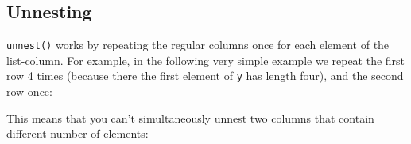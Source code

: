\documentclass[]{book}
\newenvironment{Shaded}{\begin{snugshade}}{\end{snugshade}}
\newcommand{\KeywordTok}[1]{\textcolor[rgb]{0.13,0.29,0.53}{\textbf{{#1}}}}
\newcommand{\DataTypeTok}[1]{\textcolor[rgb]{0.13,0.29,0.53}{{#1}}}
\newcommand{\DecValTok}[1]{\textcolor[rgb]{0.00,0.00,0.81}{{#1}}}
\newcommand{\StringTok}[1]{\textcolor[rgb]{0.31,0.60,0.02}{{#1}}}
\newcommand{\CommentTok}[1]{\textcolor[rgb]{0.56,0.35,0.01}{\textit{{#1}}}}
\newcommand{\OtherTok}[1]{\textcolor[rgb]{0.56,0.35,0.01}{{#1}}}
\newcommand{\NormalTok}[1]{{#1}}
\begin{document}
\begin{Shaded}
\end{Shaded}

\subsection{Unnesting}\label{unnesting-1}

\texttt{unnest()} works by repeating the regular columns once for each
element of the list-column. For example, in the following very simple
example we repeat the first row 4 times (because there the first element
of \texttt{y} has length four), and the second row once:

\begin{Shaded}
\end{Shaded}

This means that you can't simultaneously unnest two columns that contain
different number of elements:
\end{document}
